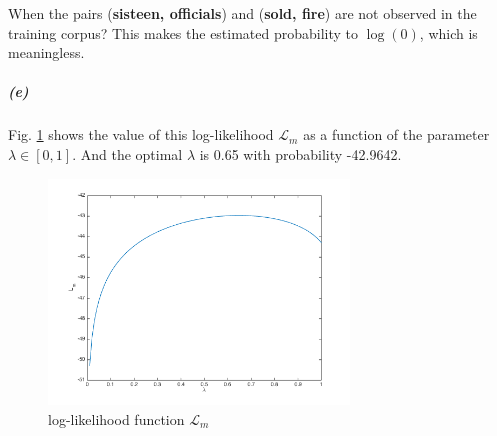 \documentclass{article}
\begin{document}
When the pairs (\textbf{sisteen, officials}) and (\textbf{sold, fire}) are not observed in the training corpus? This makes the estimated probability to $\log(0)$, which is meaningless.

\subparagraph*{(e)}

Fig. \ref{3.5e} shows the value of this log-likelihood $\mathcal{L}_m$ as a function of the parameter $\lambda \in [0,1]$. And the optimal $\lambda$ is 
0.65 with probability -42.9642.
\begin{figure}[h]
	\centering
	\includegraphics[width=8cm]{3.5e.png}
	\caption{log-likelihood function $\mathcal{L}_m$}
	\label{3.5e}
\end{figure}
\end{document}
